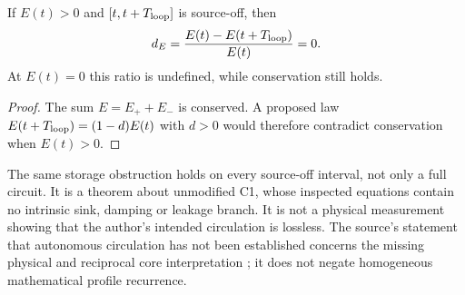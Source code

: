 \begin{corollary}\label{cor:depletion}
If $E(t)>0$ and $[t,t+T_{\rm loop}]$ is source-off, then
\begin{equation}\label{eq:depletion}
 d_E=\frac{E(t)-E(t+T_{\rm loop})}{E(t)}=0.
\end{equation}
At $E(t)=0$ this ratio is undefined, while conservation still holds.
\end{corollary}
\begin{proof}
The sum $E=E_++E_-$ is conserved. A proposed law
$E(t+T_{\rm loop})=(1-d)E(t)$ with $d>0$ would therefore contradict conservation when $E(t)>0$.
\end{proof}
The same storage obstruction holds on every source-off interval, not only a full circuit. It is a theorem about unmodified C1, whose inspected equations contain no intrinsic sink, damping or leakage branch. It is not a physical measurement showing that the author's intended circulation is lossless. The source's statement that autonomous circulation has not been established concerns the missing physical and reciprocal core interpretation \cite[conclusion]{pairedII}; it does not negate homogeneous mathematical profile recurrence.
